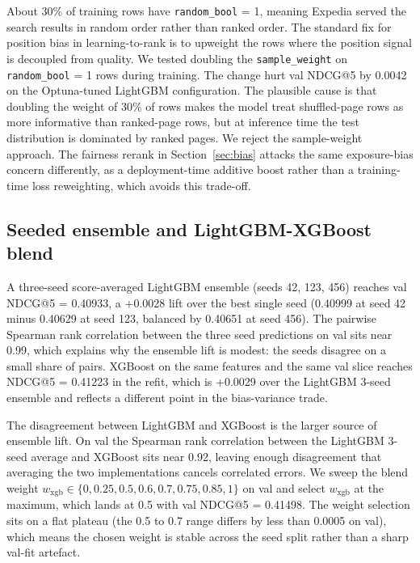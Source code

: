 About 30\% of training rows have \texttt{random\_bool} = 1, meaning Expedia served the search results in random order rather than ranked order. The standard fix for position bias in learning-to-rank is to upweight the rows where the position signal is decoupled from quality. We tested doubling the \texttt{sample\_weight} on \texttt{random\_bool} = 1 rows during training. The change hurt val NDCG@5 by 0.0042 on the Optuna-tuned LightGBM configuration. The plausible cause is that doubling the weight of 30\% of rows makes the model treat shuffled-page rows as more informative than ranked-page rows, but at inference time the test distribution is dominated by ranked pages. We reject the sample-weight approach. The fairness rerank in Section~\ref{sec:bias} attacks the same exposure-bias concern differently, as a deployment-time additive boost rather than a training-time loss reweighting, which avoids this trade-off.

\subsection{Seeded ensemble and LightGBM-XGBoost blend}\label{subsec:ensemble}

A three-seed score-averaged LightGBM ensemble (seeds 42, 123, 456) reaches val NDCG@5 = 0.40933, a +0.0028 lift over the best single seed (0.40999 at seed 42 minus 0.40629 at seed 123, balanced by 0.40651 at seed 456). The pairwise Spearman rank correlation between the three seed predictions on val sits near 0.99, which explains why the ensemble lift is modest: the seeds disagree on a small share of pairs. XGBoost on the same features and the same val slice reaches NDCG@5 = 0.41223 in the refit, which is +0.0029 over the LightGBM 3-seed ensemble and reflects a different point in the bias-variance trade.

The disagreement between LightGBM and XGBoost is the larger source of ensemble lift. On val the Spearman rank correlation between the LightGBM 3-seed average and XGBoost sits near 0.92, leaving enough disagreement that averaging the two implementations cancels correlated errors. We sweep the blend weight $w_{\text{xgb}} \in \{0, 0.25, 0.5, 0.6, 0.7, 0.75, 0.85, 1\}$ on val and select $w_{\text{xgb}}$ at the maximum, which lands at 0.5 with val NDCG@5 = 0.41498. The weight selection sits on a flat plateau (the 0.5 to 0.7 range differs by less than 0.0005 on val), which means the chosen weight is stable across the seed split rather than a sharp val-fit artefact.
